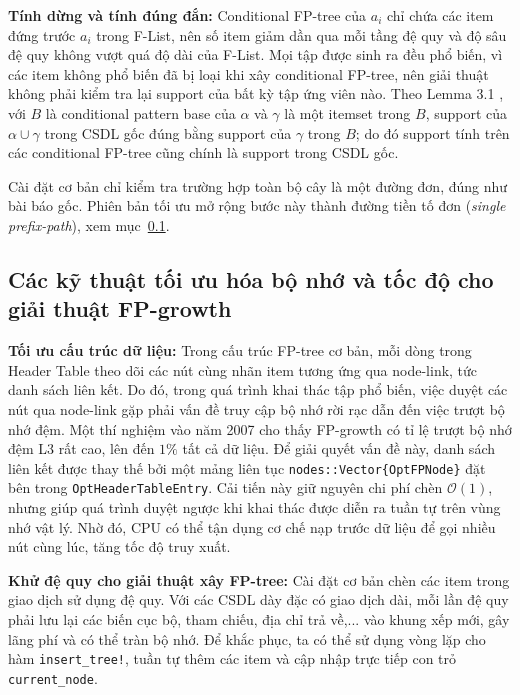 \documentclass[conference]{IEEEtran}
\begin{document}
\textbf{Tính dừng và tính đúng đắn:}
Conditional FP-tree của $a_i$ chỉ chứa các item đứng trước $a_i$ trong F-List, nên số item giảm dần qua mỗi tầng đệ quy và độ sâu đệ quy không vượt quá độ dài của F-List. Mọi tập được sinh ra đều phổ biến, vì các item không phổ biến đã bị loại khi xây conditional FP-tree, nên giải thuật không phải kiểm tra lại support của bất kỳ tập ứng viên nào. Theo Lemma 3.1 \cite{han2000mining}, với $B$ là conditional pattern base của $\alpha$ và $\gamma$ là một itemset trong $B$, support của $\alpha \cup \gamma$ trong CSDL gốc đúng bằng support của $\gamma$ trong $B$; do đó support tính trên các conditional FP-tree cũng chính là support trong CSDL gốc.

Cài đặt cơ bản chỉ kiểm tra trường hợp toàn bộ cây là một đường đơn, đúng như bài báo gốc. Phiên bản tối ưu mở rộng bước này thành đường tiền tố đơn (\textit{single prefix-path}), xem mục~\ref{subsec:optimization}.

\subsection{Các kỹ thuật tối ưu hóa bộ nhớ và tốc độ cho giải thuật FP-growth}
\label{subsec:optimization}
\textbf{Tối ưu cấu trúc dữ liệu:}
Trong cấu trúc FP-tree cơ bản, mỗi dòng trong Header Table theo dõi các nút cùng nhãn item tương ứng qua node-link, tức danh sách liên kết. Do đó, trong quá trình khai thác tập phổ biến, việc duyệt các nút qua node-link gặp phải vấn đề truy cập bộ nhớ rời rạc dẫn đến việc trượt bộ nhớ đệm. Một thí nghiệm vào năm 2007 \cite{liu2007optimization} cho thấy FP-growth có tỉ lệ trượt bộ nhớ đệm L3 rất cao, lên đến $1\%$ tất cả dữ liệu. Để giải quyết vấn đề này, danh sách liên kết được thay thế bởi một mảng liên tục \texttt{nodes::Vector\{OptFPNode\}} đặt bên trong \texttt{OptHeaderTableEntry}. Cải tiến này giữ nguyên chi phí chèn $\mathcal{O}(1)$, nhưng giúp quá trình duyệt ngược khi khai thác được diễn ra tuần tự trên vùng nhớ vật lý. Nhờ đó, CPU có thể tận dụng cơ chế nạp trước dữ liệu để gọi nhiều nút cùng lúc, tăng tốc độ truy xuất.

\textbf{Khử đệ quy cho giải thuật xây FP-tree:}
Cài đặt cơ bản chèn các item trong giao dịch sử dụng đệ quy. Với các CSDL dày đặc có giao dịch dài, mỗi lần đệ quy phải lưu lại các biến cục bộ, tham chiếu, địa chỉ trả về,... vào khung xếp mới, gây lãng phí và có thể tràn bộ nhớ. Để khắc phục, ta có thể sử dụng vòng lặp cho hàm \texttt{insert\_tree!}, tuần tự thêm các item và cập nhập trực tiếp con trỏ \texttt{current\_node}.
\end{document}
